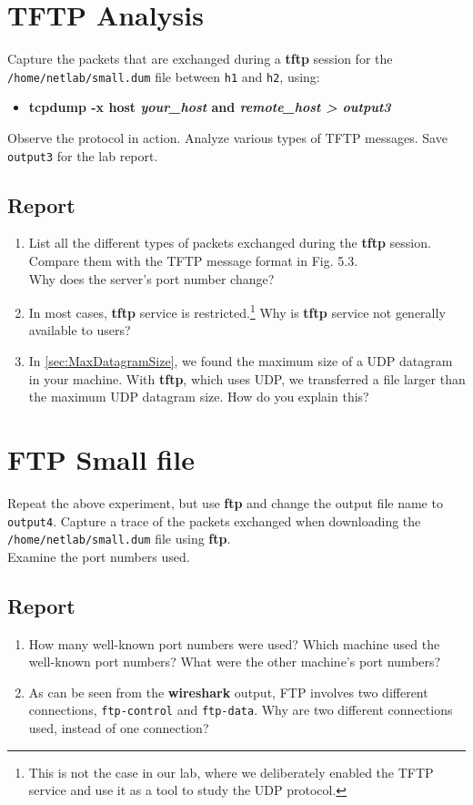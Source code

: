 \documentclass[10pt,a4paper]{article}
\numberwithin{equation}{section}
\numberwithin{figure}{section}
\numberwithin{table}{section}
\begin{document}
\section{TFTP Analysis}
	Capture the packets that are exchanged during a \textbf{tftp} session for the \linebreak \texttt{/home/netlab/small.dum} file between \texttt{h1} and \texttt{h2}, using:
	\begin{itemize}
		\item \textbf{tcpdump -x host \textit{your\_host} and \textit{remote\_host > output3}}
	\end{itemize}
	Observe the protocol in action.	Analyze various types of TFTP messages. Save \texttt{output3} for the lab report.
	\subsection*{Report}
	\begin{enumerate}
		\item List all the different types of packets exchanged during the \textbf{tftp} session. Compare them with the TFTP message format in Fig. 5.3.\\ Why does the server’s port number change?
		\item In most cases, \textbf{tftp} service is restricted.\footnote{This is not the case in our lab, where we deliberately enabled the TFTP service and use it as a tool to study the UDP protocol.}
		Why is \textbf{tftp} service not generally available to users?
		\item In \autoref{sec:MaxDatagramSize}, we found the maximum size of a UDP datagram in your machine. With \textbf{tftp}, which uses UDP, we transferred a file larger than the maximum UDP datagram size.
		How do you explain this?
	\end{enumerate}

\section{FTP Small file}
	Repeat the above experiment, but use \textbf{ftp} and change the output file name to \texttt{output4}.
	Capture a trace of the packets exchanged when downloading the \texttt{/home/netlab/small.dum} file using \textbf{ftp}. \\
	Examine the port numbers used.
	\subsection*{Report}
	\begin{enumerate}
		\item How many well-known port numbers were used?
		Which machine used the well-known port numbers?
		What were the other machine’s port numbers?
		\item As can be seen from the \textbf{wireshark} output, FTP involves two different connections, \texttt{ftp-control} and \texttt{ftp-data}.
		Why are two different connections used, instead of one connection?
	\end{enumerate}
\end{document}
